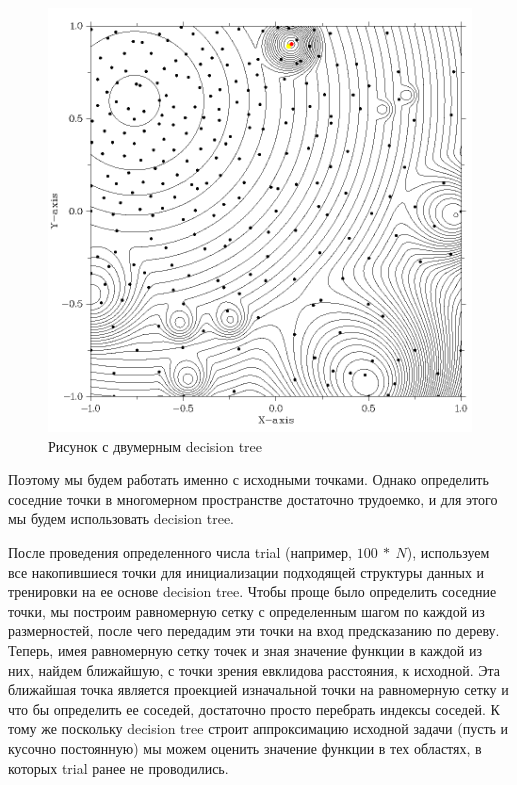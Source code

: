 \documentclass{svproc}
\begin{document}
\begin{figure}[ht!]
	\begin{center}
		\begin{minipage}[h]{0.8\linewidth}
			\includegraphics[width=1\linewidth]{figure/fig2.png}
			\caption{Рисунок с двумерным decision tree} %
			\label{fig:fig2_2}
		\end{minipage}
	\end{center}
\end{figure}	




Поэтому мы будем работать именно с исходными точками. Однако определить соседние точки в многомерном пространстве достаточно трудоемко, и для этого мы будем использовать decision tree. 

После проведения определенного числа trial (например, $100\ \ast\ N$), используем все накопившиеся точки для инициализации подходящей структуры данных и тренировки на ее основе decision tree. Чтобы проще было определить соседние точки, мы построим равномерную сетку с определенным шагом по каждой из размерностей, после чего передадим эти точки на вход предсказанию по дереву. Теперь, имея равномерную сетку точек и зная значение функции в каждой из них, найдем ближайшую, с точки зрения евклидова расстояния, к исходной. Эта ближайшая точка является проекцией изначальной точки на равномерную сетку и что бы определить  ее соседей, достаточно  просто перебрать индексы соседей. К тому же поскольку decision tree строит аппроксимацию исходной задачи (пусть и кусочно постоянную) мы можем оценить значение функции в тех областях, в которых trial ранее не проводились.
\end{document}
